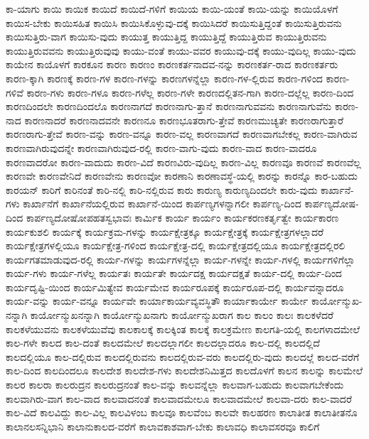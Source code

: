 {ಕಾ-ಯಾಗು
ಕಾಯಿ
ಕಾಯಿಕ
ಕಾಯಿದೆ
ಕಾಯಿದೆ-ಗಳಿಗೆ
ಕಾಯಿಯ
ಕಾಯಿ-ಯಂತೆ
ಕಾಯಿ-ಯನ್ನು
ಕಾಯಿಯೊಳಗೆ
ಕಾಯಿಸ-ಬೇಕು
ಕಾಯಿಸಹಿತ
ಕಾಯಿಸಿ
ಕಾಯಿಸಿಕೊಳ್ಳುವು-ದಕ್ಕೆ
ಕಾಯಿಸಿದರೆ
ಕಾಯಿಸುತ್ತಿದ್ದಂತೆ
ಕಾಯಿಸುತ್ತಿರುವನು
ಕಾಯಿಸುತ್ತಿರು-ವಾಗ
ಕಾಯಿಸು-ವುದು
ಕಾಯುತ್ತ
ಕಾಯುತ್ತಿದ್ದ
ಕಾಯುತ್ತಿದ್ದೆ
ಕಾಯುತ್ತಿರುವ
ಕಾಯುತ್ತಿರುವನು
ಕಾಯುತ್ತಿರುವವನು
ಕಾಯುತ್ತಿರುವುವು
ಕಾಯು-ವಂತೆ
ಕಾಯು-ವವರ
ಕಾಯುವು-ದಕ್ಕೆ
ಕಾಯು-ವುದಿಲ್ಲ
ಕಾಯು-ವುದು
ಕಾಯೇನ
ಕಾಯೊಳಗೆ
ಕಾರಕೂನ
ಕಾರಣ
ಕಾರಣಂ
ಕಾರಣಕರ್ತನಾದವ-ನನ್ನು
ಕಾರಣಕರ್ತ-ರಾದ
ಕಾರಣಕರ್ತರು
ಕಾರಣ-ಕ್ಕಾಗಿ
ಕಾರಣಕ್ಕೆ
ಕಾರಣ-ಗಳ
ಕಾರಣ-ಗಳನ್ನು
ಕಾರಣಗಳನ್ನೆಲ್ಲಾ
ಕಾರಣ-ಗಳ-ಲ್ಲಿರುವ
ಕಾರಣ-ಗಳಿಂದ
ಕಾರಣ-ಗಳಿವೆ
ಕಾರಣ-ಗಳು
ಕಾರಣ-ಗಳೂ
ಕಾರಣ-ಗಳೆಲ್ಲ
ಕಾರಣ-ಗಳೇ
ಕಾರಣದಲ್ಲಿತನ-ಗಾಗಿ
ಕಾರಣ-ದಲ್ಲೆಲ್ಲ
ಕಾರಣ-ದಿಂದ
ಕಾರಣದಿಂದಲೇ
ಕಾರಣದಿಂದಲೊ
ಕಾರಣನಾಗದೆ
ಕಾರಣನಾಗು-ತ್ತಾನೆ
ಕಾರಣನಾಗುವವನು
ಕಾರಣನಾಗುವೆನು
ಕಾರಣ-ನಾದ
ಕಾರಣನಾದರೆ
ಕಾರಣನಾದವನೇ
ಕಾರಣನೂ
ಕಾರಣಭೂತರಾಗು-ತ್ತೇವೆ
ಕಾರಣಮುಚ್ಯತೇ
ಕಾರಣರಾಗುತ್ತಾರೆ
ಕಾರಣರಾಗು-ತ್ತೇವೆ
ಕಾರಣ-ವನ್ನು
ಕಾರಣ-ವನ್ನೂ
ಕಾರಣ-ವಲ್ಲ
ಕಾರಣವಾಗದೆ
ಕಾರಣವಾಗಬೇಕಲ್ಲ
ಕಾರಣ-ವಾಗಿರುವ
ಕಾರಣವಾಗಿರುವುದನ್ನೇ
ಕಾರಣವಾಗಿರುವುದ-ರಲ್ಲಿ
ಕಾರಣ-ವಾಗು-ವುದು
ಕಾರಣ-ವಾದ
ಕಾರಣ-ವಾದರೂ
ಕಾರಣವಾದರೋ
ಕಾರಣ-ವಾದುದು
ಕಾರಣ-ವಿದೆ
ಕಾರಣವಿರು-ವುದಿಲ್ಲ
ಕಾರಣ-ವಿಲ್ಲ
ಕಾರಣವೂ
ಕಾರಣವೆ
ಕಾರಣವೆಲ್ಲ
ಕಾರಣವೇ
ಕಾರಣವೇನಿದೆ
ಕಾರಣವೇನು
ಕಾರಣವೋ
ಕಾರಣಾನಿ
ಕಾರಣಾವಸ್ಥೆ-ಯಲ್ಲಿ
ಕಾರನ್ನು
ಕಾರನ್ನೊ
ಕಾರ-ಬಹುದು
ಕಾರಯನ್
ಕಾರಿಗೆ
ಕಾರಿನಂತೆ
ಕಾರಿ-ನಲ್ಲಿ
ಕಾರಿ-ನಲ್ಲಿರುವ
ಕಾರು
ಕಾರುಣ್ಯ
ಕಾರುಣ್ಯದಿಂದಲೇ
ಕಾರು-ವುದು
ಕಾರ್ಖಾನೆ-ಗಳು
ಕಾರ್ಖಾನೆಗೆ
ಕಾರ್ಖಾನೆಯಲ್ಲಿರುವ
ಕಾರ್ಖಾನೆ-ಯಿಂದ
ಕಾರ್ಪಣ್ಯಗಳನ್ನಾಗಲೀ
ಕಾರ್ಪಣ್ಯ-ದಿಂದ
ಕಾರ್ಪಣ್ಯದೋಷ-ದಿಂದ
ಕಾರ್ಪಣ್ಯದೋಷೋಪಹತಸ್ವಭಾವಃ
ಕಾರ್ಮಿಕ
ಕಾರ್ಯ
ಕಾರ್ಯಂ
ಕಾರ್ಯಕರಣಕರ್ತೃತ್ವೇ
ಕಾರ್ಯಕಾರಣ
ಕಾರ್ಯಕುಶಲಿ
ಕಾರ್ಯಕ್ಕೆ
ಕಾರ್ಯಕ್ರಮ-ಗಳನ್ನು
ಕಾರ್ಯಕ್ಷೇತ್ರಕ್ಕೂ
ಕಾರ್ಯಕ್ಷೇತ್ರಕ್ಕೆ
ಕಾರ್ಯಕ್ಷೇತ್ರಗಳಲ್ಲಾದರೆ
ಕಾರ್ಯಕ್ಷೇತ್ರಗಳಲ್ಲಿಯೂ
ಕಾರ್ಯಕ್ಷೇತ್ರ-ಗಳಿಂದ
ಕಾರ್ಯಕ್ಷೇತ್ರ-ದಲ್ಲಿ
ಕಾರ್ಯಕ್ಷೇತ್ರದಲ್ಲಿಯೂ
ಕಾರ್ಯಕ್ಷೇತ್ರದಲ್ಲಿರಲಿ
ಕಾರ್ಯಗತಮಾಡುವುದ-ರಲ್ಲಿ
ಕಾರ್ಯ-ಗಳನ್ನು
ಕಾರ್ಯಗಳನ್ನೆಲ್ಲಾ
ಕಾರ್ಯ-ಗಳನ್ನೇ
ಕಾರ್ಯ-ಗಳಲ್ಲಿ
ಕಾರ್ಯಗಳಿಗೆಲ್ಲಾ
ಕಾರ್ಯ-ಗಳು
ಕಾರ್ಯ-ಗಳೆಲ್ಲ
ಕಾರ್ಯತಃ
ಕಾರ್ಯತೇ
ಕಾರ್ಯದಕ್ಷ
ಕಾರ್ಯದಕ್ಷತೆ
ಕಾರ್ಯ-ದಲ್ಲಿ
ಕಾರ್ಯ-ದಿಂದ
ಕಾರ್ಯದೃಷ್ಟಿ-ಯಿಂದ
ಕಾರ್ಯಮಿತ್ಯೇವ
ಕಾರ್ಯಮೇವ
ಕಾರ್ಯರೂಪಕ್ಕೆ
ಕಾರ್ಯರೂಪ-ದಲ್ಲಿ
ಕಾರ್ಯವನ್ನಾದರೂ
ಕಾರ್ಯ-ವನ್ನು
ಕಾರ್ಯ-ವನ್ನೂ
ಕಾರ್ಯವೇ
ಕಾರ್ಯಾಕಾರ್ಯವ್ಯವಸ್ಥಿತೌ
ಕಾರ್ಯಾಕಾರ್ಯೇ
ಕಾರ್ಯೇ
ಕಾರ್ಯೋನ್ಮುಖ-ನನ್ನಾಗಿ
ಕಾರ್ಯೋನ್ಮುಖನನ್ನಾಗಿ
ಕಾರ್ಯೋನ್ಮುಖನಾಗು
ಕಾರ್ಯೋನ್ಮುಖರಾಗ
ಕಾಲ
ಕಾಲಂ
ಕಾಲಃ
ಕಾಲಕಳೆದರೆ
ಕಾಲಕಳೆಯುವನು
ಕಾಲಕಳೆಯುವೆವು
ಕಾಲಕಾಲಕ್ಕೆ
ಕಾಲಕ್ಕಿಂತ
ಕಾಲಕ್ಕೆ
ಕಾಲಕ್ರಮೇಣ
ಕಾಲಗತಿ-ಯಲ್ಲಿ
ಕಾಲಗಳಾದಮೇಲೆ
ಕಾಲ-ಗಳೇ
ಕಾಲದ
ಕಾಲ-ದಂತೆ
ಕಾಲದಮೇಲೆ
ಕಾಲದಲ್ಲಾಗಲೀ
ಕಾಲದಲ್ಲಾದರೂ
ಕಾಲ-ದಲ್ಲಿ
ಕಾಲದಲ್ಲಿದೆ
ಕಾಲದಲ್ಲಿಯೂ
ಕಾಲ-ದಲ್ಲಿರುವ
ಕಾಲದಲ್ಲಿರುವನು
ಕಾಲದಲ್ಲಿರುವ-ವರು
ಕಾಲದಲ್ಲಿರು-ವುದು
ಕಾಲದಲ್ಲೆ
ಕಾಲದ-ವರೆಗೆ
ಕಾಲ-ದಿಂದ
ಕಾಲದಿಂದಲೂ
ಕಾಲದೇಶ
ಕಾಲದೇಶ-ಗಳು
ಕಾಲದೇಶನಿಮಿತ್ತದ
ಕಾಲದೊಳಗೆ
ಕಾಲನ
ಕಾಲನ್ನು
ಕಾಲಮೇಲೆ
ಕಾಲರ
ಕಾಲರಾ
ಕಾಲರುದ್ರನ
ಕಾಲರುದ್ರನಂತೆ
ಕಾಲ-ವನ್ನು
ಕಾಲವನ್ನೆಲ್ಲಾ
ಕಾಲವಾಗ-ಬಹುದು
ಕಾಲವಾಗಬೇಕೆಂದು
ಕಾಲವಾಗಿರು-ವಾಗ
ಕಾಲ-ವಾದ
ಕಾಲವಾದನಂತೆ
ಕಾಲವಾದಮೇಲೂ
ಕಾಲವಾದಮೇಲೆ
ಕಾಲವಾ-ದರು
ಕಾಲ-ವಾದರೆ
ಕಾಲ-ವಿದೆ
ಕಾಲವಿದ್ದು
ಕಾಲ-ವಿಲ್ಲ
ಕಾಲವಿಳಂಬ
ಕಾಲವೂ
ಕಾಲವೆಂಬ
ಕಾಲವೇ
ಕಾಲಹರಣ
ಕಾಲಾತೀತ
ಕಾಲಾತೀತನೊ
ಕಾಲಾನಲಸನ್ನಿಭಾನಿ
ಕಾಲಾನುಕಾಲದ-ವರೆಗೆ
ಕಾಲಾವಕಾಶವಾಗ-ಬೇಕು
ಕಾಲಾವಧಿ
ಕಾಲಾವಸರವೂ
ಕಾಲಿಗೆ
}
